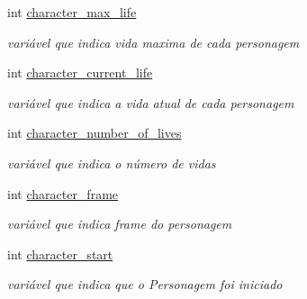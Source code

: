 \begin{DoxyCompactItemize}
\mbox{\label{classCharacter_a2f4be8102c8557a93b67b8fac9679dd8}} 
int \mbox{\hyperlink{classCharacter_a2f4be8102c8557a93b67b8fac9679dd8}{character\+\_\+max\+\_\+life}}
\begin{DoxyCompactList}\small\item\em variável que indica vida maxima de cada personagem \end{DoxyCompactList}\item 
\mbox{\label{classCharacter_a0e29776ad32bfcf2ca55838f00d29933}} 
int \mbox{\hyperlink{classCharacter_a0e29776ad32bfcf2ca55838f00d29933}{character\+\_\+current\+\_\+life}}
\begin{DoxyCompactList}\small\item\em variável que indica a vida atual de cada personagem \end{DoxyCompactList}\item 
\mbox{\label{classCharacter_a46b1ccac564ac16935cb22a82e62bc27}} 
int \mbox{\hyperlink{classCharacter_a46b1ccac564ac16935cb22a82e62bc27}{character\+\_\+number\+\_\+of\+\_\+lives}}
\begin{DoxyCompactList}\small\item\em variável que indica o número de vidas \end{DoxyCompactList}\item 
\mbox{\label{classCharacter_adf140a8993f2a10b77ebf3415460f48b}} 
int \mbox{\hyperlink{classCharacter_adf140a8993f2a10b77ebf3415460f48b}{character\+\_\+frame}}
\begin{DoxyCompactList}\small\item\em variável que indica frame do personagem \end{DoxyCompactList}\item 
\mbox{\label{classCharacter_a52bd80f30b5a19bae445d2566819704b}} 
int \mbox{\hyperlink{classCharacter_a52bd80f30b5a19bae445d2566819704b}{character\+\_\+start}}
\begin{DoxyCompactList}\small\item\em variável que indica que o Personagem foi iniciado \end{DoxyCompactList}\item 
\mbox{\label{classCharacter_a8ede7c049b28ca40d1b35c0e14cc1c66}} 

\end{DoxyCompactItemize}
